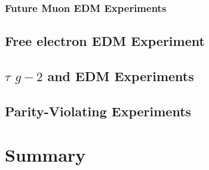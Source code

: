 \subsubsection{Future Muon EDM Experiments}

\subsection{Free electron EDM Experiment}\label{sec:cl:eEDM}

\subsection{$\tau$ $g-2$ and EDM Experiments}\label{sec:cl:taug-2exp}

\subsection{Parity-Violating Experiments}\label{sec:cl:pve}


\section{Summary}\label{sec:cl:gm2edmdisc}




